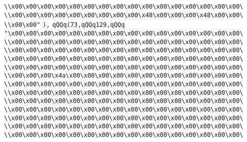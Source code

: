 \verb|\\x00\x00\x00\x00\x00\x00\x00\x00\x00\x00\x00\x00\x00\x00\x00\x00\|\newline
\verb|\\x00\x00\x00\x00\x00\x00\x00\x00\x00\x48\x00\x00\x00\x48\x00\x00\|\newline
\verb|\\x00\x00"|\newline
\verb|),|\newline
\verb|qQQq(73,qQQq129,qQQq|\newline
\verb|"\x00\x00\x00\x00\x00\x00\x00\x00\x00\x00\x00\x00\x00\x00\x00\x00\|\newline
\verb|\\x00\x00\x00\x00\x00\x00\x00\x00\x00\x00\x00\x00\x00\x00\x00\x00\|\newline
\verb|\\x00\x00\x00\x00\x00\x00\x00\x00\x00\x00\x00\x00\x00\x00\x00\x00\|\newline
\verb|\\x00\x00\x00\x00\x00\x00\x00\x00\x00\x00\x00\x00\x00\x00\x00\x00\|\newline
\verb|\\x00\x00\x00\x00\x00\x00\x00\x00\x00\x00\x00\x00\x00\x00\x00\x00\|\newline
\verb|\\x00\x00\x00\x4a\x00\x00\x00\x00\x00\x00\x00\x00\x00\x00\x00\x00\|\newline
\verb|\\x00\x00\x00\x00\x00\x00\x00\x00\x00\x00\x00\x00\x00\x00\x00\x00\|\newline
\verb|\\x00\x00\x00\x00\x00\x00\x00\x00\x00\x00\x00\x00\x00\x00\x00\x00\|\newline
\verb|\\x00\x00\x00\x00\x00\x00\x00\x00\x00\x00\x00\x00\x00\x00\x00\x00\|\newline
\verb|\\x00\x00\x00\x00\x00\x00\x00\x00\x00\x00\x00\x00\x00\x00\x00\x00\|\newline
\verb|\\x00\x00\x00\x00\x00\x00\x00\x00\x00\x00\x00\x00\x00\x00\x00\x00\|\newline
\verb|\\x00\x00\x00\x00\x00\x00\x00\x00\x00\x00\x00\x00\x00\x00\x00\x00\|\newline
\verb|\\x00\x00\x00\x00\x00\x00\x00\x00\x00\x00\x00\x00\x00\x00\x00\x00\|\newline
